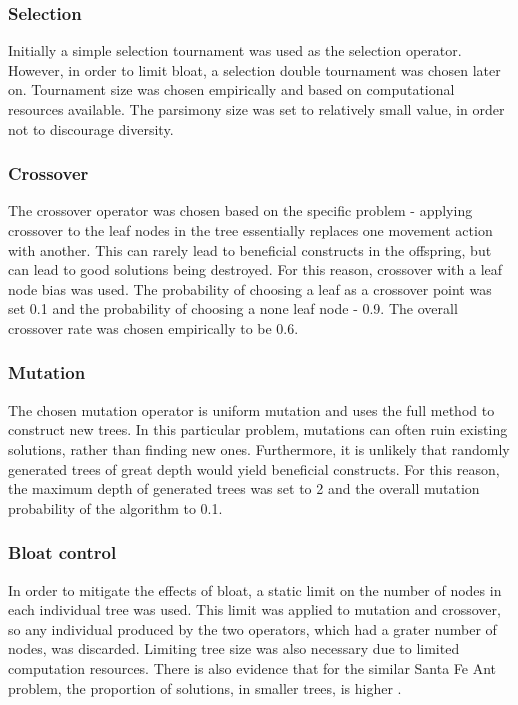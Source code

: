 \documentclass[12pt,a4paper]{article}
\begin{document}
	\subsubsection{Selection}
	Initially a simple selection tournament was used as the selection operator. However, in order to limit bloat, a selection double tournament was chosen later on. Tournament size was chosen empirically and based on computational resources available. The parsimony size was set to relatively small value, in order not to discourage diversity.
	
	\subsubsection{Crossover}
	The crossover operator was chosen based on the specific problem - applying crossover to the leaf nodes in the tree essentially replaces one movement action with another. This can rarely lead to beneficial constructs in the offspring, but can lead to good solutions being destroyed. For this reason, crossover with a leaf node bias was used. The probability of choosing a leaf as a crossover point was set 0.1 and the probability of choosing a none leaf node - 0.9. The overall crossover rate was chosen empirically to be 0.6.
		
	\subsubsection{Mutation}
	The chosen mutation operator is uniform mutation and uses the full method to construct new trees. In this particular problem, mutations can often ruin existing solutions, rather than finding new ones. Furthermore, it is unlikely that randomly generated  trees of great depth would yield beneficial constructs. For this reason, the maximum depth of generated trees was set to 2 and the overall mutation probability of the algorithm to 0.1.  
	
	\subsubsection{Bloat control} \label{subsubsec:bloat}
	In order to mitigate the effects of bloat, a static limit on the number of nodes in each individual tree was used. This limit was applied to mutation and crossover, so any individual produced by the two operators, which had a grater number of nodes, was discarded. Limiting tree size was also necessary due to limited computation resources. There is also evidence that for the similar Santa Fe Ant problem, the proportion of solutions, in smaller trees, is higher \cite{langdon_why_1998}. 
	
\end{document}
